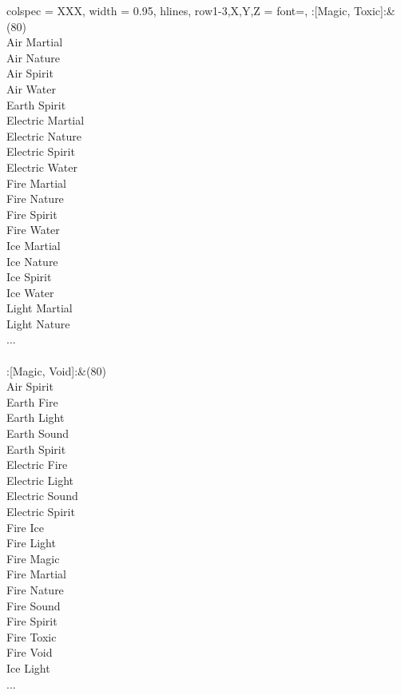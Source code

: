 \begin{longtblr}[
	caption = {2v2 Defending Weak},
	label = {2v2-Defending-Weak},
]{
	colspec = {XXX}, width = 0.95\linewidth,
	hlines,
	row{1-3,X,Y,Z} = {font=\bfseries},
}
	:[Magic, Toxic]:&{(80)\\
	Air Martial \\
	Air Nature \\
	Air Spirit \\
	Air Water \\
	Earth Spirit \\
	Electric Martial \\
	Electric Nature \\
	Electric Spirit \\
	Electric Water \\
	Fire Martial \\
	Fire Nature \\
	Fire Spirit \\
	Fire Water \\
	Ice Martial \\
	Ice Nature \\
	Ice Spirit \\
	Ice Water \\
	Light Martial \\
	Light Nature \\
	...\\
	}\\

	:[Magic, Void]:&{(80)\\
	Air Spirit \\
	Earth Fire \\
	Earth Light \\
	Earth Sound \\
	Earth Spirit \\
	Electric Fire \\
	Electric Light \\
	Electric Sound \\
	Electric Spirit \\
	Fire Ice \\
	Fire Light \\
	Fire Magic \\
	Fire Martial \\
	Fire Nature \\
	Fire Sound \\
	Fire Spirit \\
	Fire Toxic \\
	Fire Void \\
	Ice Light \\
	...\\
	}\\


\end{longtblr}
